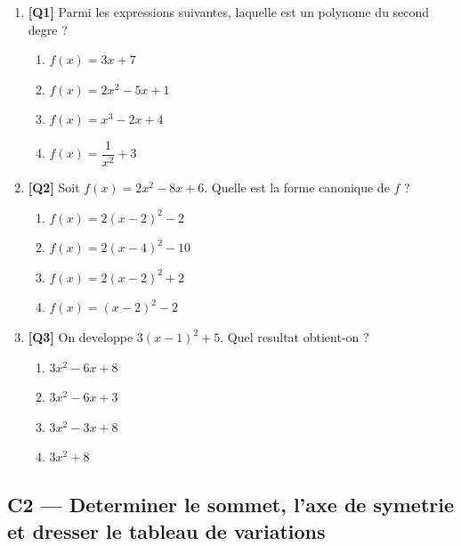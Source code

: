 \begin{enumerate}

\item \textbf{[Q1]} Parmi les expressions suivantes, laquelle est un polynome du second degre ?

  \begin{enumerate}[label=\Alph*.]
    \item $f(x) = 3x + 7$
    \item $f(x) = 2x^2 - 5x + 1$
    \item $f(x) = x^3 - 2x + 4$
    \item $f(x) = \dfrac{1}{x^2} + 3$
  \end{enumerate}

\bigskip

\item \textbf{[Q2]} Soit $f(x) = 2x^2 - 8x + 6$. Quelle est la forme canonique de $f$ ?

  \begin{enumerate}[label=\Alph*.]
    \item $f(x) = 2(x - 2)^2 - 2$
    \item $f(x) = 2(x - 4)^2 - 10$
    \item $f(x) = 2(x - 2)^2 + 2$
    \item $f(x) = (x - 2)^2 - 2$
  \end{enumerate}

\bigskip

\item \textbf{[Q3]} On developpe $3(x - 1)^2 + 5$. Quel resultat obtient-on ?

  \begin{enumerate}[label=\Alph*.]
    \item $3x^2 - 6x + 8$
    \item $3x^2 - 6x + 3$
    \item $3x^2 - 3x + 8$
    \item $3x^2 + 8$
  \end{enumerate}

\end{enumerate}

\bigskip

\subsection*{C2 — Determiner le sommet, l'axe de symetrie et dresser le tableau de variations}

